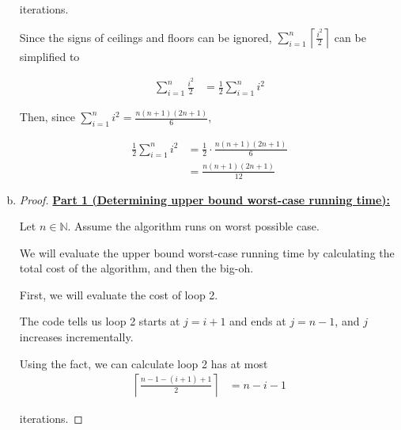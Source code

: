 \documentclass[12pt]{article}
\begin{document}
\begin{enumerate}[a.]
    iterations.

    \bigskip

    Since the signs of ceilings and floors can be ignored, $\sum\limits_{i=1}^{n} \left\lceil \frac{i^2}{2} \right\rceil$
    can be simplified to

    \begin{align}
        \sum\limits_{i=1}^{n} \frac{i^2}{2} &= \frac{1}{2} \sum\limits_{i=1}^{n} i^2
    \end{align}

    \bigskip

    Then, since $\sum\limits_{i=1}^{n} i^2 = \frac{n(n+1)(2n+1)}{6}$,

    \begin{align}
        \frac{1}{2} \sum\limits_{i=1}^{n} i^2 &= \frac{1}{2} \cdot \frac{n(n+1)(2n+1)}{6}\\
        &= \frac{n(n+1)(2n+1)}{12}
    \end{align}

    \item

    \begin{proof}
        \underline{\textbf{Part 1 (Determining upper bound worst-case running time):}}

        \bigskip

        Let $n \in \mathbb{N}$. Assume the algorithm runs on worst possible case.

        \bigskip

        We will evaluate the upper bound worst-case running time by calculating the
        total cost of the algorithm, and then the big-oh.

        \bigskip

        First, we will evaluate the cost of loop 2.

        \bigskip

        The code tells us loop 2 starts at $j = i + 1$ and ends at $j = n - 1$, and
        $j$ increases incrementally.

        \bigskip

        Using the fact, we can calculate loop 2 has at most
        \setcounter{equation}{0}
        \begin{align}
            \left\lceil \frac{n-1-(i+1)+1}{2} \right\rceil &= n - i - 1
        \end{align}

        iterations.

        \bigskip


\end{proof}
\end{enumerate}
\end{document}
